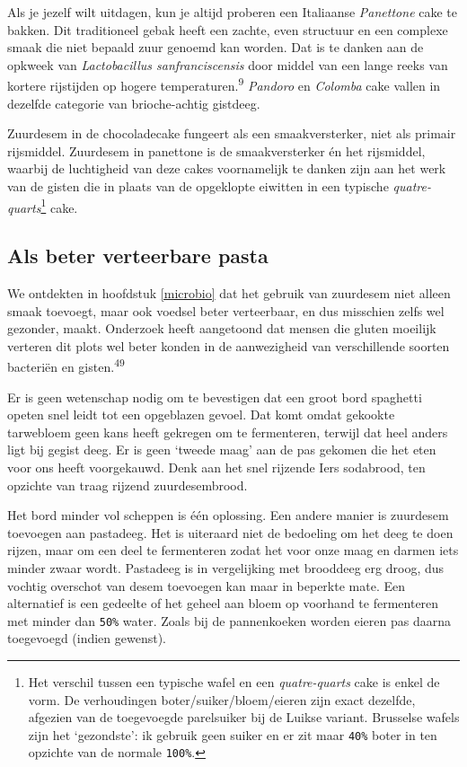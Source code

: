 \documentclass[
  11pt,
  dutch,
]{memoir}
\begin{document}
Als je jezelf wilt uitdagen, kun je altijd proberen een Italiaanse
\emph{Panettone} cake te bakken. Dit traditioneel gebak heeft een
zachte, even structuur en een complexe smaak die niet bepaald zuur
genoemd kan worden. Dat is te danken aan de opkweek van
\emph{Lactobacillus sanfranciscensis} door middel van een lange reeks
van kortere rijstijden op hogere temperaturen.\textsuperscript{9}
\emph{Pandoro} en \emph{Colomba} cake vallen in dezelfde categorie van
brioche-achtig gistdeeg.

Zuurdesem in de chocoladecake fungeert als een smaakversterker, niet als
primair rijsmiddel. Zuurdesem in panettone is de smaakversterker én het
rijsmiddel, waarbij de luchtigheid van deze cakes voornamelijk te danken
zijn aan het werk van de gisten die in plaats van de opgeklopte eiwitten
in een typische \emph{quatre-quarts}\footnote{Het verschil tussen een
  typische wafel en een \emph{quatre-quarts} cake is enkel de vorm. De
  verhoudingen boter/suiker/bloem/eieren zijn exact dezelfde, afgezien
  van de toegevoegde parelsuiker bij de Luikse variant. Brusselse wafels
  zijn het `gezondste': ik gebruik geen suiker en er zit maar
  \texttt{40\%} boter in ten opzichte van de normale \texttt{100\%}.}
cake.

\hypertarget{als-beter-verteerbare-pasta}{%
\subsection{Als beter verteerbare
pasta}\label{als-beter-verteerbare-pasta}}

We ontdekten in hoofdstuk \ref{microbio} dat het gebruik van zuurdesem
niet alleen smaak toevoegt, maar ook voedsel beter verteerbaar, en dus
misschien zelfs wel gezonder, maakt. Onderzoek heeft aangetoond dat
mensen die gluten moeilijk verteren dit plots wel beter konden in de
aanwezigheid van verschillende soorten bacteriën en
gisten.\textsuperscript{49}

Er is geen wetenschap nodig om te bevestigen dat een groot bord
spaghetti opeten snel leidt tot een opgeblazen gevoel. Dat komt omdat
gekookte tarwebloem geen kans heeft gekregen om te fermenteren, terwijl
dat heel anders ligt bij gegist deeg. Er is geen `tweede maag' aan de
pas gekomen die het eten voor ons heeft voorgekauwd. Denk aan het snel
rijzende Iers sodabrood, ten opzichte van traag rijzend zuurdesembrood.

Het bord minder vol scheppen is één oplossing. Een andere manier is
zuurdesem toevoegen aan pastadeeg. Het is uiteraard niet de bedoeling om
het deeg te doen rijzen, maar om een deel te fermenteren zodat het voor
onze maag en darmen iets minder zwaar wordt. Pastadeeg is in
vergelijking met brooddeeg erg droog, dus vochtig overschot van desem
toevoegen kan maar in beperkte mate. Een alternatief is een gedeelte of
het geheel aan bloem op voorhand te fermenteren met minder dan
\texttt{50\%} water. Zoals bij de pannenkoeken worden eieren pas daarna
toegevoegd (indien gewenst).
\end{document}
